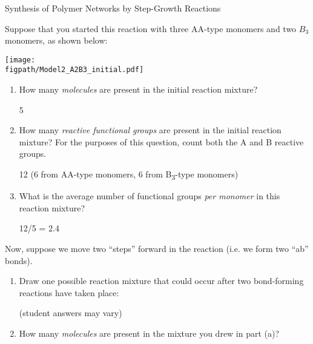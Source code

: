 \begin{activity}[extension]{Synthesis of Polymer Networks by Step-Growth Reactions}
\begin{model}
\end{model}

\begin{ctqs}

	\question Suppose that you started this reaction with three AA-type monomers and two $B_3$ monomers, as shown below:
	
	\vspace{9pt}
		\centerline{\texttt{[image: \\figpath/Model2\_A2B3\_initial.pdf]}}
	
		\begin{enumerate}
			\item How many \emph{molecules} are present in the initial reaction mixture?
			
				\begin{solution}[0.5in]{}
					5
				\end{solution}
			
			\item How many \emph{reactive functional groups} are present in the initial reaction mixture?  For the purposes of this question, count both the A and B reactive groups.
			
				\begin{solution}[0.5in]{}
					12 (6 from AA-type monomers, 6 from B\textsubscript{3}-type monomers)
				\end{solution}
				
			\item What is the average number of functional groups \emph{per monomer} in this reaction mixture?
			
				\begin{solution}[0.5in]{}
					12/5 = 2.4
				\end{solution}
			
		\end{enumerate}
	
	\clearpage
	\question Now, suppose we move two ``steps'' forward in the reaction (i.e. we form two ``ab'' bonds).
	
		\begin{enumerate}
		
			\item Draw one possible reaction mixture that could occur after two bond-forming reactions have taken place:
			
				\begin{solution}[1.5in]{}
				
					(student answers may vary)
					
				\end{solution}
			\item How many \emph{molecules} are present in the mixture you drew in part (a)?
			

\end{enumerate}
\end{ctqs}
\end{activity}
